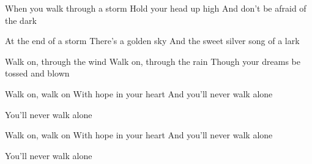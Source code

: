\begin{verse*}
When you walk through a storm
Hold your head up high
And don't be afraid of the dark
\end{verse*}

\begin{verse*}
At the end of a storm
There's a golden sky
And the sweet silver song of a lark
\end{verse*}

\begin{verse*}
Walk on, through the wind
Walk on, through the rain
Though your dreams be tossed and blown
\end{verse*}

\begin{verse*}
Walk on, walk on
With hope in your heart
And you'll never walk alone
\end{verse*}

\begin{verse*}
You'll never walk alone
\end{verse*}

\begin{verse*}
Walk on, walk on
With hope in your heart
And you'll never walk alone
\end{verse*}

\begin{verse*}
You'll never walk alone
\end{verse*}
